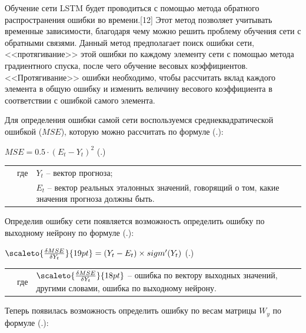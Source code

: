 {\gostFont

  \par \redline Обучение сети LSTM будет проводиться с помощью метода обратного распространения ошибки во времени.[12] Этот метод позволяет учитывать временные зависимости, благодаря чему можно решить проблему обучения сети с обратными связями. Данный метод предполагает поиск ошибки сети, <<протягивание>> этой ошибки по каждому элементу сети с помощью метода градиентного спуска, после чего обучение весовых коэффициентов. <<Протягивание>> ошибки необходимо, чтобы рассчитать вклад каждого элемента в общую ошибку и изменить величину весового коэффициента в соответствии с ошибкой самого элемента. 

  \par \redline Для определения ошибки самой сети воспользуемся среднеквадратической ошибкой ($MSE$), которую можно рассчитать по формуле (\thechaptercntr .\theformulacntr):

  \formulaspace \par \redline 
    $MSE = 0.5 \cdot (E_t - Y_t)^2$
    \hfill (\thechaptercntr .\theformulacntr) \redline
  \formulaspace \addtocounter{formulacntr}{1}

  \begin{tabular}{p{}p{}p{}}
		& где  & $Y_t$ {--} вектор прогноза; \\
		& 	   & $E_t$ {--} вектор реальных эталонных значений, говорящий о том, какие значения прогноза должны быть. \\
  \end{tabular}

  \par \redline Определив ошибку сети появляется возможность определить ошибку по выходному нейрону по формуле (\thechaptercntr .\theformulacntr):

  \formulaspace \par \redline 
    $\scaleto{\frac{\delta MSE}{\delta Y_t}}{19pt} = (Y_t - E_t) \times sigm'(Y_t)$
    \hfill (\thechaptercntr .\theformulacntr) \redline
  \formulaspace \addtocounter{formulacntr}{1}

  \begin{tabular}{p{}p{}p{}}
		& где  & $\scaleto{\frac{\delta MSE}{\delta Y_t}}{18pt}$ {--} ошибка по вектору выходных значений, другими словами, ошибка по выходному нейрону. \\
  \end{tabular}

  \par \redline Теперь появилась возможность определить ошибку по весам матрицы $W_y$ по формуле (\thechaptercntr .\theformulacntr):

}
